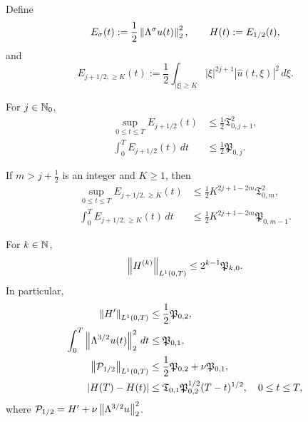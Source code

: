 \begin{proposition}
\label{u:prop:qc-critical-height}
Define
\[
 E_\sigma(t):=\frac12\left\lVert \Lambda^\sigma u(t)\right\rVert_2^2,
 \qquad
 H(t):=E_{1/2}(t),
\]
and
\[
 E_{j+1/2,\ge K}(t)
 :=\frac12\int_{|\xi|\ge K}|\xi|^{2j+1}
 |\widehat u(t,\xi)|^2\,d\xi.
\]
\begin{samepage}
For \(j\in\mathbb N_0\),
\begin{align}
 \sup_{0\le t\le T}E_{j+1/2}(t)
 &\le\frac12\mathfrak T_{0,j+1}^2,
 \label{u:eq:qc-critical-sup}\\
 \int_0^T E_{j+1/2}(t)\,dt
 &\le\frac12\mathfrak P_{0,j}.
 \label{u:eq:qc-critical-mass}
\end{align}
\end{samepage}
If \(m>j+\frac12\) is an integer and \(K\ge1\), then
\begin{align}
 \sup_{0\le t\le T}E_{j+1/2,\ge K}(t)
 &\le\frac12K^{2j+1-2m}\mathfrak T_{0,m}^2,
 \label{u:eq:qc-critical-tail-sup}\\
 \int_0^T E_{j+1/2,\ge K}(t)\,dt
 &\le\frac12K^{2j+1-2m}\mathfrak P_{0,m-1}.
 \label{u:eq:qc-critical-tail-mass}
\end{align}
\begin{samepage}
For \(k\in\mathbb N\),
\begin{equation}
 \left\lVert H^{(k)}\right\rVert_{L^1(0,T)}
 \le2^{k-1}\mathfrak P_{k,0}.
 \label{u:eq:qc-height-derivatives}
\end{equation}
In particular,
\begin{align}
 \left\lVert H'\right\rVert_{L^1(0,T)}
 &\le\frac12\mathfrak P_{0,2},
 \label{u:eq:qc-critical-variation}\\
 \int_0^T\left\lVert \Lambda^{3/2}u(t)\right\rVert_2^2\,dt
 &\le\mathfrak P_{0,1},
 \label{u:eq:qc-critical-dissipation}\\
 \left\lVert \mathcal P_{1/2}\right\rVert_{L^1(0,T)}
 &\le\frac12\mathfrak P_{0,2}+\nu\mathfrak P_{0,1},
 \label{u:eq:qc-critical-current}\\
 |H(T)-H(t)|
 &\le
 \mathfrak T_{0,1}\mathfrak P_{0,2}^{1/2}(T-t)^{1/2},
 \quad0\le t\le T,
 \label{u:eq:qc-critical-endpoint-modulus}
\end{align}
where
\(\mathcal P_{1/2}=H'+\nu\left\lVert \Lambda^{3/2}u\right\rVert_2^2\).
\end{samepage}
\end{proposition}

